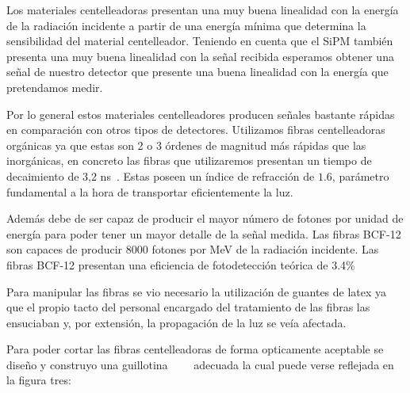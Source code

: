 Los materiales centelleadoras presentan una muy buena linealidad con la energía de la radiación incidente a partir de una energía mínima que determina la sensibilidad del material centelleador. Teniendo en cuenta que el SiPM también presenta una muy buena linealidad con la señal recibida esperamos obtener una señal de nuestro detector que presente una buena linealidad con la energía que pretendamos medir.

Por lo general estos materiales centelleadores producen señales bastante rápidas en comparación con otros tipos de detectores. Utilizamos fibras centelleadoras orgánicas ya que estas son 2 o 3 órdenes de magnitud más rápidas que las inorgánicas,  en concreto las fibras que utilizaremos presentan un tiempo de decaimiento de 3,2 ns~\cite{datasheet}. Estas poseen un índice de refracción de $1.6$, parámetro fundamental a la hora de transportar eficientemente la luz.

Además debe de ser capaz de producir el mayor número de fotones por unidad de energía para poder tener un mayor detalle de la señal medida. Las fibras BCF-12 son capaces de producir 8000 fotones por MeV de la radiación incidente. Las fibras BCF-12 presentan una eficiencia de fotodetección teórica de 3.4\% ~\cite{datasheet}

Para manipular las fibras se vio necesario la utilización de guantes de latex ya que el propio tacto  del personal encargado del tratamiento de las fibras las ensuciaban y, por extensión, la propagación de la luz se veía afectada.

Para poder cortar las fibras centelleadoras de forma opticamente aceptable se diseño y construyo una guillotina~\cite{Alberto}~\cite{anguloytiempo}~\cite{dependencias}~\cite{tesisfibras} adecuada la cual puede verse reflejada en la figura tres:

